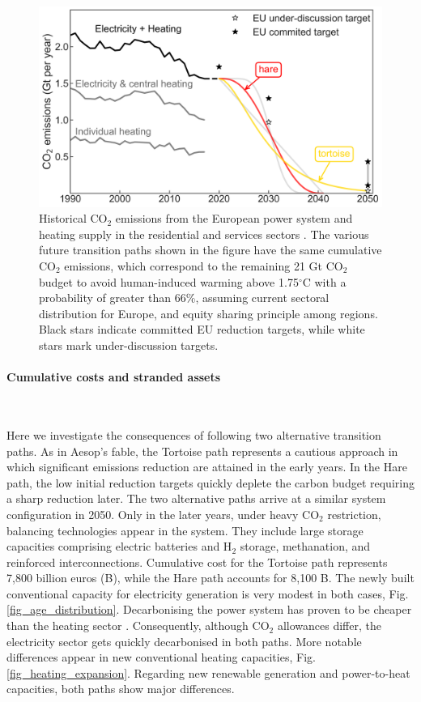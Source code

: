 \documentclass[5p]{elsarticle} %
\begin{document}
\begin{figure}[!h]
\centering
	\includegraphics[width=\columnwidth]{figures/carbon_budget.png}
\caption{Historical CO$_2$ emissions from the European power system and heating supply in the residential and services sectors \cite{UNFCCC_inventory}. The various future transition paths shown in the figure have the same cumulative CO$_2$ emissions, which correspond to the remaining 21 Gt CO$_2$ budget to avoid human-induced warming above 1.75$^{\circ}$C with a probability of greater than 66\%, assuming current sectoral distribution for Europe, and equity sharing principle among regions. Black stars indicate committed EU reduction targets, while white stars mark under-discussion targets.} \label{fig_carbon_budget} 
\end{figure}

\paragraph{\textbf{Cumulative costs and stranded assets}} \

Here we investigate the consequences of following two alternative transition paths. As in Aesop's fable, the Tortoise path represents a cautious approach in which significant emissions reduction are attained in the early years. In the Hare path, the low initial reduction targets quickly deplete the carbon budget requiring a sharp reduction later. The two alternative paths arrive at a similar system configuration in 2050. Only in the later years, under heavy CO$_2$ restriction, balancing technologies appear in the system. They include large storage capacities comprising electric batteries and H$_2$ storage, methanation, and reinforced interconnections.  Cumulative cost for the Tortoise path represents 7,800 billion euros (B\EUR), while the Hare path accounts for 8,100 B\EUR. The newly built conventional capacity for electricity generation is very modest in both cases, Fig. \ref{fig_age_distribution}. Decarbonising the power system has proven to be cheaper than the heating sector \cite{Zhu_2019}. Consequently, although CO$_2$ allowances differ, the electricity sector gets quickly decarbonised in both paths. More notable differences appear in new conventional heating capacities, Fig. \ref{fig_heating_expansion}. Regarding new renewable generation and power-to-heat capacities, both paths show major differences.
\end{document}
